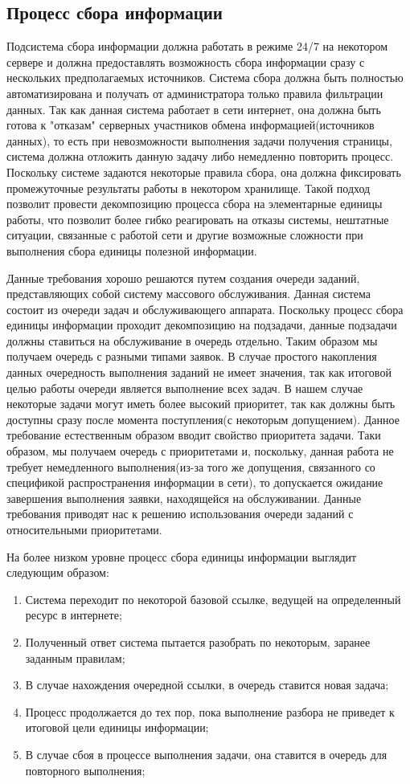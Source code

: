 \subsection{Процесс сбора информации}

Подсистема сбора информации должна работать в режиме 24/7 на некотором сервере и должна предоставлять возможность сбора информации сразу с нескольких предполагаемых источников.
Система сбора должна быть полностью автоматизирована и получать от администратора только правила фильтрации данных. Так как данная система работает в сети интернет, она должна быть готова к "отказам" серверных участников обмена информацией(источников данных), то есть при невозможности выполнения задачи получения страницы, система должна отложить данную задачу либо немедленно повторить процесс. Поскольку системе задаются некоторые правила сбора, она должна фиксировать промежуточные результаты работы в некотором хранилище. Такой подход позволит провести декомпозицию процесса сбора на элементарные единицы работы, что позволит более гибко реагировать на отказы системы, нештатные ситуации, связанные с работой сети и другие возможные сложности при выполнения сбора единицы полезной информации.

Данные требования хорошо решаются путем создания очереди заданий, представляющих собой систему массового обслуживания. Данная система состоит из очереди задач и обслуживающего аппарата. Поскольку процесс сбора единицы информации проходит декомпозицию на подзадачи, данные подзадачи должны ставиться на обслуживание в очередь отдельно. Таким образом мы получаем очередь с разными типами заявок. В случае простого накопления данных очередность выполнения заданий не имеет значения, так как итоговой целью работы очереди является выполнение всех задач. В нашем случае некоторые задачи могут иметь более высокий приоритет, так как должны быть доступны сразу после момента поступления(с некоторым допущением).
Данное требование естественным образом вводит свойство приоритета задачи. Таки образом, мы получаем очередь с приоритетами и, поскольку, данная работа не требует немедленного выполнения(из-за того же допущения, связанного со спецификой распространения информации в сети), то допускается ожидание завершения выполнения заявки, находящейся на обслуживании.
Данные требования приводят нас к решению использования очереди заданий с относительными приоритетами. 

На более низком уровне процесс сбора единицы информации выглядит следующим образом:
\begin{enumerate}
\item Система переходит по некоторой базовой ссылке, ведущей на определенный ресурс в интернете;
\item Полученный ответ система пытается разобрать по некоторым, заранее заданным правилам;
\item В случае нахождения очередной ссылки, в очередь ставится новая задача;
\item Процесс продолжается до тех пор, пока выполнение разбора не приведет к итоговой цели единицы информации;
\item В случае сбоя в процессе выполнения задачи, она ставится в очередь для повторного выполнения;
\end{enumerate}

